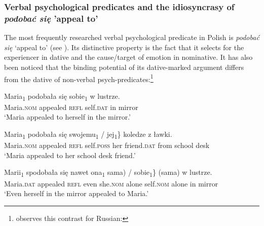\documentclass[output=paper,modfonts,nonflat
]{langsci/langscibook}
\begin{document}
\subsubsection{Verbal psychological predicates and the idiosyncrasy of \textit{podobać się} ’appeal to’} \label{s3.2.2}

The most frequently researched verbal psychological predicate in Polish is \textit{podobać się} ‘appeal to’ (see \citealt{miechowicz2008,bondaruk2007,zychlinski2013,jimenezfernandez2016,bondaruketal2017}). Its distinctive property is the fact that it selects for the experiencer in dative and the cause/target of emotion in nominative. It has also been noticed that the binding potential of its dative-marked argument differs from the dative of non-verbal psych-predicates:\footnote{\label{fn23}\cite[253]{franks1995} observes this contrast for Russian:
\z
{}
\z
{}
\z}

\ea \label{ex:witkos:41}
\gll Maria\textsubscript{1} podobała się sobie\textsubscript{1} w lustrze.\\
 Maria.\textsc{nom} appealed \textsc{refl} self.\textsc{dat} in mirror\\
\glt `Maria appealed to herself in the mirror.'
\z

\ea \label{ex:witkos:42}
\gll Maria\textsubscript{1} podobała się \minsp{\{} swojemu\textsubscript{1} / \minsp{*} jej\textsubscript{1}\} koledze z ławki.\\
 Maria.\textsc{nom} appealed \textsc{refl} {} self.\textsc{poss} {} {} her friend.\textsc{dat} from school desk\\
\glt `Maria appealed to her school desk friend.'
\z

\ea \label{ex:witkos:43}
\gll Marii\textsubscript{1} spodobała się nawet  ona\textsubscript{1} \minsp{\{(} sama) / \minsp{*} sobie\textsubscript{1}\} (sama) w lustrze.\\
     Maria.\textsc{dat} appealed \textsc{refl} even {} she.\textsc{nom} {} alone {} {} self.\textsc{nom} alone in mirror\\
\glt `Even herself in the mirror appealed to Maria.'
\z
\end{document}
